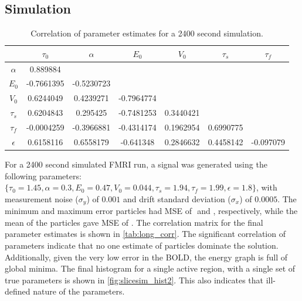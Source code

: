 \documentclass[journal]{./IEEEtran}
\begin{document}
\subsection{Simulation}
\begin{table}[t]
\centering
\begin{tabular}{|c | c  c  c  c  c  c  |}
\hline
  & $\tau_0$ & $\alpha$ & $E_0$    & $V_0$    & $\tau_s$ & $\tau_f$ \\
\hline
$\alpha$                      & 0.889884 & & & & & \\
\rowcolor[gray]{.8} $E_0$     & -0.7661395 & -0.5230723 & & & & \\
$V_0$                         & 0.6244049 & 0.4239271 & -0.7964774 & & & \\
\rowcolor[gray]{.8} $\tau_s$  & 0.6204843 & 0.295425 & -0.7481253 & 0.3440421 & & \\
$\tau_f$                      & -0.0004259 & -0.3966881 & -0.4314174 & 0.1962954 & 0.6990775 & \\
\rowcolor[gray]{.8} $\epsilon$& 0.6158116 & 0.6558179 & -0.641348 & 0.2846632 & 0.4458142 & -0.097079 \\
\hline
\end{tabular}
\caption{Correlation of parameter estimates for a 2400 second simulation.}
\label{tab:long_corr}
\end{table}

For a 2400 second simulated FMRI run, a signal was generated using the 
following parameters:
$\{\tau_0 = 1.45, \alpha = 0.3, E_0 = 0.47, V_0 = 0.044, \tau_s = 1.94, \tau_f = 1.99, \epsilon = 1.8\}$,
with measurement noise ($\sigma_y$) of $0.001$ and drift standard deviation
($\sigma_x$) of $0.0005$. The minimum and maximum error particles had MSE of $ $ and $ $,
respectively, while the mean of the particles gave MSE of $ $. %
The correlation matrix for the final parameter estimates is shown in \autoref{tab:long_corr}.
The significant correlation of parameters indicate that no one estimate of 
particles dominate the solution. Additionally, given the very low error in the BOLD,
the energy graph is full of global minima. The final histogram for a single active region, 
with a single set of true parameters is shown in \autoref{fig:slicesim_hist2}.
This also indicates that ill-defined nature of the parameters. 
\end{document}
